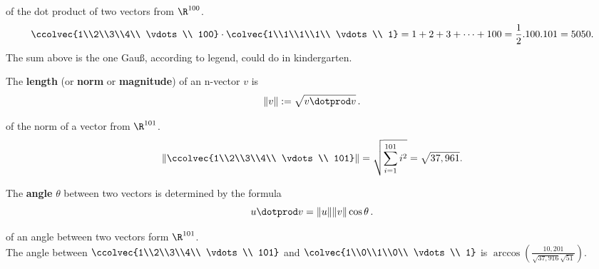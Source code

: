 \begin{example} of the dot product of two vectors from $\R^{100}$.
\[ \ccolvec{1\\2\\3\\4\\ \vdots \\ 100} \cdot 
\colvec{1\\1\\1\\1\\ \vdots \\ 1} = 1+2+3+\cdots+100=\frac12.100.101=5050.
\]
The sum above is the one Gau\ss, according to legend, could do in kindergarten.
\end{example}

\begin{definition} 
The {\bf length} (or {\bf norm} or {\bf magnitude}) of an n-vector $v$ is 
\[\|v\| := \sqrt{v\dotprod v }\, .\]
\end{definition} 

\begin{example} 
of the norm of a vector from $\R^{101}$.\\
\[\left\| \ccolvec{1\\2\\3\\4\\ \vdots \\ 101}\right\|
= 
\sqrt{\sum_{i=1}^{101} i^2} =   \sqrt{37,961}.
\]
\end{example}

\begin{definition} 
The {\bf angle} $\theta$ between two vectors is determined by the formula \[u\dotprod v = \|u\|\|v\|\cos \theta\, .\]
\end{definition}

\begin{example} of an angle between two vectors form $\R^{101}$.\\
The angle between $ \ccolvec{1\\2\\3\\4\\ \vdots \\ 101} $ and 
$
\colvec{1\\0\\1\\0\\ \vdots \\ 1} $
is
$ 
\arccos  \left( \frac{10,201 }{\sqrt{37,916} \sqrt{51} } \right).
$
\end{example}




